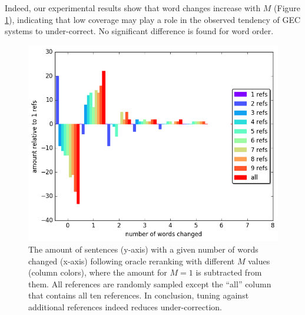 \documentclass[11pt, a4paper]{article}
\begin{document}
Indeed, our experimental results show that word changes increase with $M$ (Figure \ref{fig:reranking_word_change}),
indicating that low coverage may play a role in the observed tendency of GEC systems to under-correct.
No significant difference is found for word order.

%
\begin{figure}
	\includegraphics[width=0.9\columnwidth]{words_relative_differences_hist_reranking}
	\caption{The amount of sentences (y-axis) with a given number of words changed (x-axis) following oracle reranking with different $M$ values (column colors), 
	where the amount for $M=1$ is subtracted from them.
		All references are randomly sampled except the ``all'' column that contains all ten references.
		In conclusion, tuning against additional references indeed reduces under-correction.
		\label{fig:reranking_word_change}
	}
\end{figure}

%
%
\end{document}
